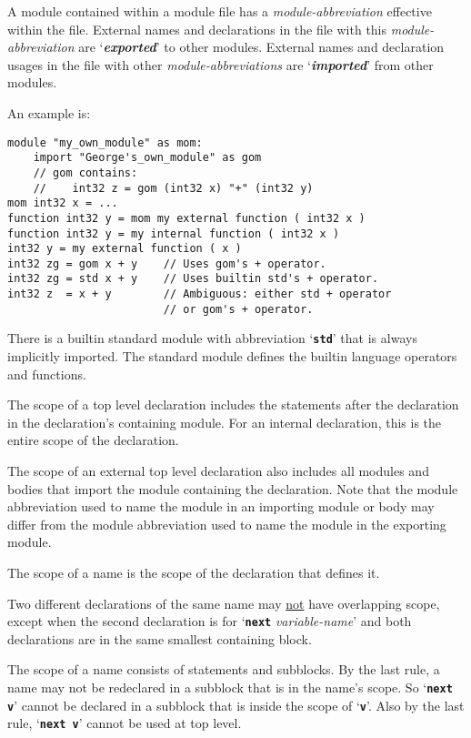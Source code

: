 \documentclass[12pt]{article}
\newcommand{\TT}[1]{{\tt \bfseries #1}}
\newcommand{\skey}[2]{{\bf \em #1#2}\index{#1}}
\newenvironment{indpar}[1][0.3in]%
	{\begin{list}{}%
		     {\setlength{\itemsep}{0in}%
		      \setlength{\topsep}{0in}%
		      \setlength{\parsep}{1ex}%
		      \setlength{\labelwidth}{#1}%
		      \setlength{\leftmargin}{#1}%
		      \addtolength{\leftmargin}{\labelsep}}%
	 \item}%
	{\end{list}}
\begin{document}
A module contained within a module file has a {\em module-abbreviation}
effective within the file.
External names and declarations in the file with this
{\em module-abbreviation} are `\skey{export}{ed}' to
other modules.
External names and declaration usages in the file with other
{\em module-abbreviations} are `\skey{import}{ed}' from other
modules.

An example is:
\begin{indpar}\begin{verbatim}
module "my_own_module" as mom:
    import "George's_own_module" as gom
    // gom contains:
    //    int32 z = gom (int32 x) "+" (int32 y)
mom int32 x = ...
function int32 y = mom my external function ( int32 x )
function int32 y = my internal function ( int32 x )
int32 y = my external function ( x )
int32 zg = gom x + y    // Uses gom's + operator.
int32 zg = std x + y    // Uses builtin std's + operator.
int32 z  = x + y        // Ambiguous: either std + operator
                        // or gom's + operator.
\end{verbatim}\end{indpar}\label{EXTERNAL-INTERNAL-EXAMPLE}

There is a builtin standard module with abbreviation `\TT{std}'
that is always implicitly imported.  The standard module defines
the builtin language operators and functions.

The scope of a top level declaration includes the statements
after the declaration in the declaration's containing module.
For an internal declaration, this is the entire scope of
the declaration.

The scope of an external top level declaration also includes
all modules and bodies that import the module containing the declaration.
Note that the module abbreviation used to name the
module in an importing module or body
may differ from the module abbreviation
used to name the module in the exporting module.

The scope of a name is the scope of the declaration that defines
it.

Two different declarations of the same name may \underline{not}
have overlapping scope, except when the second declaration is
for `\TT{next} {\em variable-name}' and both declarations are
in the same smallest containing block.

The scope of a name consists of statements and subblocks.
By the last rule, a name may not be
redeclared in a subblock that is in the name's scope.
So `\TT{next v}' cannot be declared in a subblock that is inside the scope
of `\TT{v}'.  Also by the last rule, `\TT{next v}' cannot be used
at top level.
\end{document}
